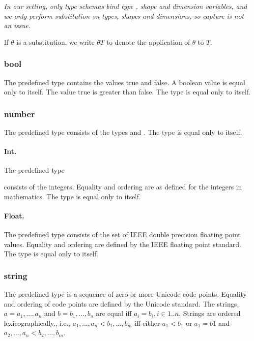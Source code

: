 \documentclass{article}
\begin{document}
{  {\em 
  In our setting, only type schemas bind type , shape and dimension variables, and we only perform substitution on types, shapes and dimensions, so capture is not an issue.
  }
  
If $\theta$ is a substitution, we write $\theta T$ to denote the application of $\theta$ to $T$.

\subsubsection{bool}
\label{bool}

The predefined type \BOOL{} contains the values true and false.  A boolean value is equal only to itself. The value true is greater than false. The type \BOOL{} is equal only to itself.

\subsubsection{number}
\label{number}

 The predefined type \NUMBER{} consists of the types \INT{} and \FLOAT. The type \NUMBER{} is equal only to itself. 
 
 \paragraph{Int.} The predefined type \INT} consists of the integers. Equality and ordering are as defined for the integers in mathematics. The type \INT{} is equal only to itself.

 \paragraph{Float.} The predefined type \FLOAT{} consists of the set of IEEE double precision floating point values.  Equality and ordering are defined by the IEEE floating point standard.  The type \FLOAT{} is equal only to itself.
 

 
\subsubsection{string}
\label{string}

The predefined type \STRING{} is a sequence of zero or more Unicode code points. Equality and ordering of code points are defined by the Unicode standard. 
The strings, $a = a_1, \ldots, a_n$ and $b = b_1, \ldots, b_n$ are equal iff $a_i = b_i, i \in 1..n$. Strings are ordered lexicographically., i.e., $a_1, \ldots, a_n < b_1, \ldots, b_m$ iff  either $a_1 < b_1$ or $a_1 = b1$ and $a_2, \ldots, a_n < b_2, \ldots, b_m$.
\end{document}
